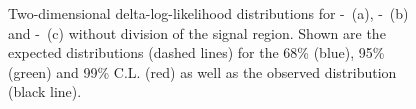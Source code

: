 \begin{figure}
	\centering
	\caption[Two-dimensional delta-log-likelihood distributions for the three combinations of aTGC parameters without division of the signal region]{Two-dimensional delta-log-likelihood distributions for \Tcwww -\Tccw \ (a), \Tcwww -\Tcb \ (b) and \Tccw -\Tcb\ (c) without division of the signal region. Shown are the expected distributions (dashed lines) for the 68\% (blue), 95\% (green) and 99\% C.L. (red) as well as the observed distribution (black line).}
	\label{fig:limits:2dlimits_nocat}	
\end{figure}